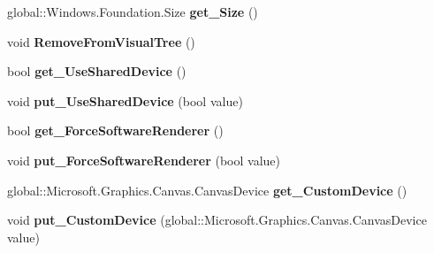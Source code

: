 \begin{DoxyCompactItemize}
global\+::\+Windows.\+Foundation.\+Size {\bfseries get\+\_\+\+Size} ()
\item 
\mbox{\label{class_microsoft_1_1_graphics_1_1_canvas_1_1_u_i_1_1_xaml_1_1_canvas_control_af9c6b8f3ff29e316e100e88d7589504e}} 
void {\bfseries Remove\+From\+Visual\+Tree} ()
\item 
\mbox{\label{class_microsoft_1_1_graphics_1_1_canvas_1_1_u_i_1_1_xaml_1_1_canvas_control_a60b81107044570bfbd0172ea06746e1a}} 
bool {\bfseries get\+\_\+\+Use\+Shared\+Device} ()
\item 
\mbox{\label{class_microsoft_1_1_graphics_1_1_canvas_1_1_u_i_1_1_xaml_1_1_canvas_control_afca7bdc3fc83df242ce81d1c39623cea}} 
void {\bfseries put\+\_\+\+Use\+Shared\+Device} (bool value)
\item 
\mbox{\label{class_microsoft_1_1_graphics_1_1_canvas_1_1_u_i_1_1_xaml_1_1_canvas_control_a51aee0f1702e89a1b82f375115a547d2}} 
bool {\bfseries get\+\_\+\+Force\+Software\+Renderer} ()
\item 
\mbox{\label{class_microsoft_1_1_graphics_1_1_canvas_1_1_u_i_1_1_xaml_1_1_canvas_control_aca2f5a0d6e74e822c5b8eb8fdc11fdb7}} 
void {\bfseries put\+\_\+\+Force\+Software\+Renderer} (bool value)
\item 
\mbox{\label{class_microsoft_1_1_graphics_1_1_canvas_1_1_u_i_1_1_xaml_1_1_canvas_control_af204874c5165fa9f4ae14854c00c88eb}} 
global\+::\+Microsoft.\+Graphics.\+Canvas.\+Canvas\+Device {\bfseries get\+\_\+\+Custom\+Device} ()
\item 
\mbox{\label{class_microsoft_1_1_graphics_1_1_canvas_1_1_u_i_1_1_xaml_1_1_canvas_control_ac2d0adb9485907acaacb48b62a8b4f36}} 
void {\bfseries put\+\_\+\+Custom\+Device} (global\+::\+Microsoft.\+Graphics.\+Canvas.\+Canvas\+Device value)

\end{DoxyCompactItemize}
